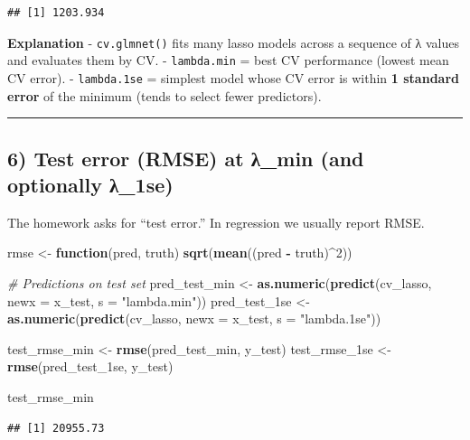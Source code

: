 \documentclass[
]{article}
\newenvironment{Shaded}{\begin{snugshade}}{\end{snugshade}}
\newcommand{\AttributeTok}[1]{\textcolor[rgb]{0.13,0.29,0.53}{#1}}
\newcommand{\CommentTok}[1]{\textcolor[rgb]{0.56,0.35,0.01}{\textit{#1}}}
\newcommand{\ControlFlowTok}[1]{\textcolor[rgb]{0.13,0.29,0.53}{\textbf{#1}}}
\newcommand{\DecValTok}[1]{\textcolor[rgb]{0.00,0.00,0.81}{#1}}
\newcommand{\FunctionTok}[1]{\textcolor[rgb]{0.13,0.29,0.53}{\textbf{#1}}}
\newcommand{\NormalTok}[1]{#1}
\newcommand{\OtherTok}[1]{\textcolor[rgb]{0.56,0.35,0.01}{#1}}
\newcommand{\SpecialCharTok}[1]{\textcolor[rgb]{0.81,0.36,0.00}{\textbf{#1}}}
\newcommand{\StringTok}[1]{\textcolor[rgb]{0.31,0.60,0.02}{#1}}
\begin{document}
\begin{verbatim}
## [1] 1203.934
\end{verbatim}

\textbf{Explanation} - \texttt{cv.glmnet()} fits many lasso models
across a sequence of λ values and evaluates them by CV. -
\texttt{lambda.min} = best CV performance (lowest mean CV error). -
\texttt{lambda.1se} = simplest model whose CV error is within \textbf{1
standard error} of the minimum (tends to select fewer predictors).

\begin{center}\rule{0.5\linewidth}{0.5pt}\end{center}

\subsection{6) Test error (RMSE) at λ\_min (and optionally
λ\_1se)}\label{test-error-rmse-at-ux3bb_min-and-optionally-ux3bb_1se}

The homework asks for ``test error.'' In regression we usually report
RMSE.

\begin{Shaded}
\begin{Highlighting}[]
\NormalTok{rmse }\OtherTok{\textless{}{-}} \ControlFlowTok{function}\NormalTok{(pred, truth) }\FunctionTok{sqrt}\NormalTok{(}\FunctionTok{mean}\NormalTok{((pred }\SpecialCharTok{{-}}\NormalTok{ truth)}\SpecialCharTok{\^{}}\DecValTok{2}\NormalTok{))}

\CommentTok{\# Predictions on test set}
\NormalTok{pred\_test\_min }\OtherTok{\textless{}{-}} \FunctionTok{as.numeric}\NormalTok{(}\FunctionTok{predict}\NormalTok{(cv\_lasso, }\AttributeTok{newx =}\NormalTok{ x\_test, }\AttributeTok{s =} \StringTok{"lambda.min"}\NormalTok{))}
\NormalTok{pred\_test\_1se }\OtherTok{\textless{}{-}} \FunctionTok{as.numeric}\NormalTok{(}\FunctionTok{predict}\NormalTok{(cv\_lasso, }\AttributeTok{newx =}\NormalTok{ x\_test, }\AttributeTok{s =} \StringTok{"lambda.1se"}\NormalTok{))}

\NormalTok{test\_rmse\_min }\OtherTok{\textless{}{-}} \FunctionTok{rmse}\NormalTok{(pred\_test\_min, y\_test)}
\NormalTok{test\_rmse\_1se }\OtherTok{\textless{}{-}} \FunctionTok{rmse}\NormalTok{(pred\_test\_1se, y\_test)}

\NormalTok{test\_rmse\_min}
\end{Highlighting}
\end{Shaded}

\begin{verbatim}
## [1] 20955.73
\end{verbatim}
\end{document}
